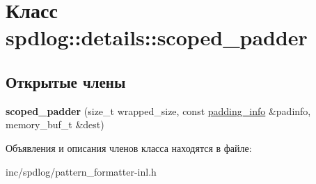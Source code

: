 \hypertarget{classspdlog_1_1details_1_1scoped__padder}{}\section{Класс spdlog\+:\+:details\+:\+:scoped\+\_\+padder}
\label{classspdlog_1_1details_1_1scoped__padder}
\subsection*{Открытые члены}
\begin{DoxyCompactItemize}
\item 
\mbox{\label{classspdlog_1_1details_1_1scoped__padder_a000deb6179bef70b262263a2394cb577}} 
{\bfseries scoped\+\_\+padder} (size\+\_\+t wrapped\+\_\+size, const \hyperlink{structspdlog_1_1details_1_1padding__info}{padding\+\_\+info} \&padinfo, memory\+\_\+buf\+\_\+t \&dest)
\end{DoxyCompactItemize}


Объявления и описания членов класса находятся в файле\+:\begin{DoxyCompactItemize}
\item 
inc/spdlog/pattern\+\_\+formatter-\/inl.\+h\end{DoxyCompactItemize}
